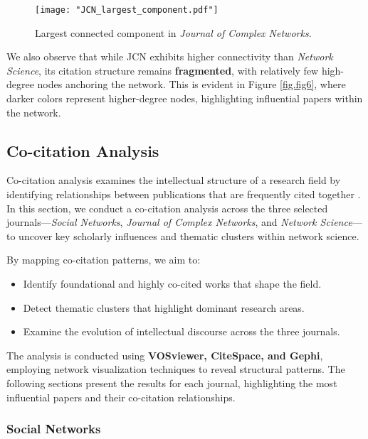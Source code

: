 \documentclass[twocolumn]{article}
\begin{document}
	\begin{figure}[htbp]
		\centering
		\texttt{[image: "JCN\_largest\_component.pdf"]}
		\caption{Largest connected component in \textit{Journal of Complex Networks}.}
		\label{fig.fig7}
	\end{figure}
	
	We also observe that while JCN exhibits higher connectivity than \textit{Network Science}, its citation structure remains \textbf{fragmented}, with relatively few high-degree nodes anchoring the network. This is evident in Figure \ref{fig.fig6}, where darker colors represent higher-degree nodes, highlighting influential papers within the network.
	
	\subsection{Co-citation Analysis}
	
	Co-citation analysis examines the intellectual structure of a research field by identifying relationships between publications that are frequently cited together \cite{Small1973}. In this section, we conduct a co-citation analysis across the three selected journals—\textit{Social Networks}, \textit{Journal of Complex Networks}, and \textit{Network Science}—to uncover key scholarly influences and thematic clusters within network science.
	
	By mapping co-citation patterns, we aim to:
	\begin{itemize}
		\item Identify foundational and highly co-cited works that shape the field.
		\item Detect thematic clusters that highlight dominant research areas.
		\item Examine the evolution of intellectual discourse across the three journals.
	\end{itemize}
	
	The analysis is conducted using \textbf{VOSviewer, CiteSpace, and Gephi}\cite{vanEck2010vosviewer,Chen2006,bastian2009gephi}, employing network visualization techniques to reveal structural patterns. The following sections present the results for each journal, highlighting the most influential papers and their co-citation relationships. 
	
	\subsubsection*{Social Networks}
	
\end{document}
